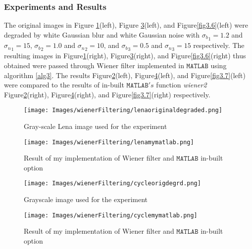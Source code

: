 \documentclass[a4paper]{book}
\begin{document}
\subsubsection*{Experiments and Results}
 The original images in Figure \ref{fig3.2}(left), Figure \ref{fig3.4}(left), and Figure\ref{fig3.6}(left)  were degraded by white Gaussian blur and white Gaussian noise with $ {\sigma_b}_1 = 1.2 $ and $ {\sigma_n}_1 = 15 $, $ {\sigma_b}_2 = 1.0 $ and $ {\sigma_n}_2 = 10 $, and $ {\sigma_b}_3 = 0.5 $ and $ {\sigma_n}_3 = 15 $ respectively. The resulting images in Figure\ref{fig3.2}(right),  Figure\ref{fig3.4}(right), and  Figure\ref{fig3.6}(right) thus obtained were passed through Wiener filter implemented in $ \mathtt{MATLAB} $ using algorithm \ref{alg3}. 
 The results Figure\ref{fig3.3}(left), Figure\ref{fig3.5}(left), and Figure\ref{fig3.7}(left) were compared to the results of in-built $ \mathtt{MATLAB}'s $ function \textit{wiener2} Figure\ref{fig3.3}(right), Figure\ref{fig3.5}(right), and Figure\ref{fig3.7}(right) respectively.

\begin{figure}[H]		
	\begin{center}
		\texttt{[image: Images/wienerFiltering/lenaoriginaldegraded.png]}
		\caption{Gray-scale Lena image used for the experiment}
		\label{fig3.2}
	\end{center}
\end{figure}

\begin{figure}[H]		
	\begin{center}
		\texttt{[image: Images/wienerFiltering/lenamymatlab.png]}	
			\caption{Result of my implementation of Wiener filter and $ \mathtt{MATLAB} $ in-built option}
			\label{fig3.3}
	\end{center}		
\end{figure}

\begin{figure}[H]		
	\begin{center}
		\texttt{[image: Images/wienerFiltering/cycleorigdegrd.png]}
		\caption{Grayscale image used for the experiment}
		\label{fig3.4}
	\end{center}
\end{figure}
\begin{figure}[H]		
	\begin{center}
		\texttt{[image: Images/wienerFiltering/cyclemymatlab.png]}	
		\caption{Result of my implementation of Wiener filter and $ \mathtt{MATLAB} $ in-built option}
		\label{fig3.5}
	\end{center}
\end{figure}
\end{document}
